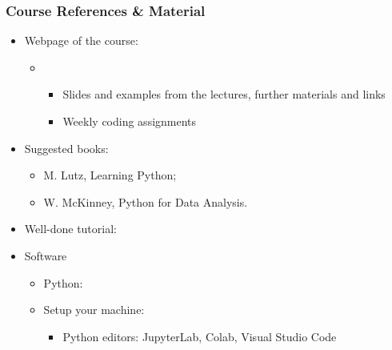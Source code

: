 \begin{frame}
  \frametitle{Course References \& Material}
  \begin{itemize}
  \item Webpage of the course:
	\begin{itemize}
	\item \myurl{\homepage}
  \\ %
  \begin{itemize}
  \item Slides and examples from the lectures, further materials and links
  \item Weekly coding assignments
  \end{itemize}
  \end{itemize}
  \end{itemize}
\begin{itemize}
\item Suggested books: 
\begin{itemize}
	\item M. Lutz, Learning Python; 
	\item W. McKinney, Python for Data Analysis.
	  \end{itemize}
\item Well-done tutorial: 
\item Software
\begin{itemize}
\item Python: 
\item Setup your machine: 
\myurl{\homepagesetup}
    \begin{itemize}
    	\item Python editors: JupyterLab, Colab, Visual Studio Code
    \end{itemize}

 \end{itemize}
 \end{itemize}
\end{frame}